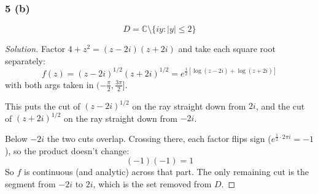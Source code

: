 \documentclass{article}
\newenvironment{solution}{
\begin{proof}[Solution]}{
\end{proof}}
\begin{document}
\subsubsection*{5 (b)}
\[ D = \mathbb{C} \setminus \{iy : |y| \le 2\} \]
\begin{solution}
  Factor $4+z^2=(z-2i)(z+2i)$ and take each square root separately:
  \[
    f(z)=(z-2i)^{1/2}(z+2i)^{1/2}=e^{\frac{1}{2}\left[\log(z-2i)+\log(z+2i)\right]}
  \]
  with both args taken in $(-\frac{\pi}{2},\frac{3\pi}{2}]$.

  This puts the cut of $(z-2i)^{1/2}$ on the ray straight down from $2i$, and the cut of $(z+2i)^{1/2}$ on the ray straight down from $-2i$.

  Below $-2i$ the two cuts overlap. Crossing there, each factor flips sign ($e^{\frac{1}{2}\cdot2\pi i}=-1$), so the product doesn't change:
  \[
    (-1)(-1)=1
  \]
  So $f$ is continuous (and analytic) across that part. The only remaining cut is the segment from $-2i$ to $2i$, which is the set removed from $D$.
\end{solution}
\end{document}
